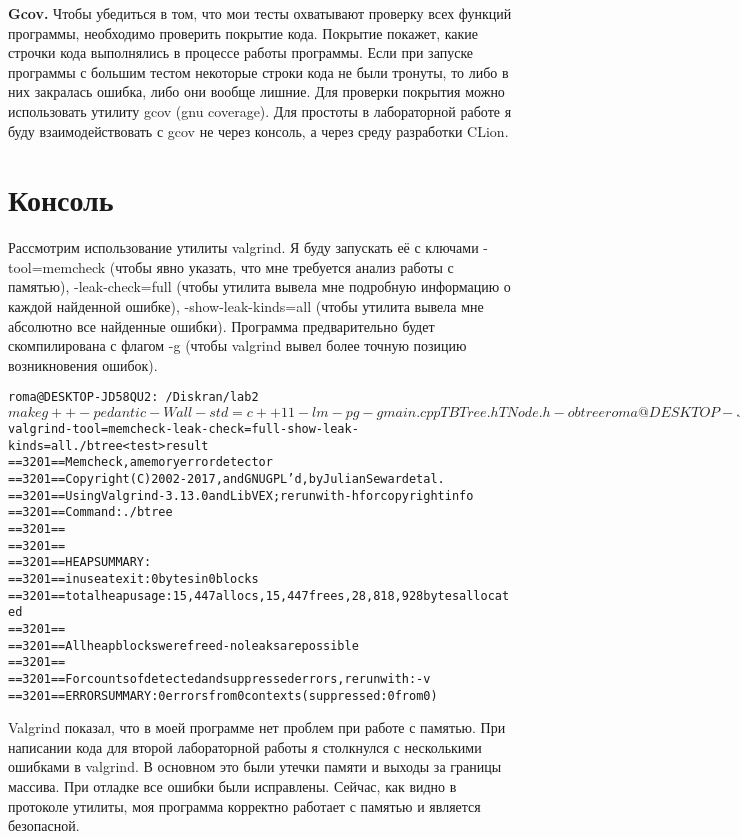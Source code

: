 \textbf{Gcov.} Чтобы убедиться в том, что мои тесты охватывают проверку всех функций программы, необходимо проверить покрытие 
кода. Покрытие покажет, какие строчки кода выполнялись в процессе работы программы. Если при запуске программы с большим тестом 
некоторые строки кода не были тронуты, то либо в них закралась ошибка, либо они вообще лишние. Для проверки покрытия можно 
использовать утилиту gcov (gnu coverage). Для простоты в лабораторной работе я буду взаимодействовать с gcov не через консоль, 
а через среду разработки CLion.


\pagebreak

\section{Консоль}


Рассмотрим использование утилиты valgrind. Я буду запускать её с ключами -tool=memcheck (чтобы явно указать, что мне требуется 
анализ работы с памятью), -leak-check=full (чтобы утилита вывела мне подробную информацию о каждой найденной ошибке), 
-show-leak-kinds=all (чтобы утилита вывела мне абсолютно все найденные ошибки). Программа предварительно будет скомпилирована 
с флагом -g (чтобы valgrind вывел более точную позицию возникновения ошибок).

\begin{alltt}

roma@DESKTOP-JD58QU2:~/Diskran/lab2$ make 
g++ -pedantic -Wall -std=c++11 -lm -pg -g main.cpp TBTree.h TNode.h -o btree 
roma@DESKTOP-JD58QU2:~/Diskran/lab2$ valgrind -tool=memcheck -leak-check=full -show-leak-kinds=all ./btree <test >result 
==3201== Memcheck,a memory error detector 
==3201== Copyright (C) 2002-2017,and GNU GPL’d,by Julian Seward et al.
==3201== Using Valgrind-3.13.0 and LibVEX; rerun with -h for copyright info 
==3201== Command: ./btree 
==3201== 
==3201== 
==3201== HEAP SUMMARY: 
==3201== in use at exit: 0 bytes in 0 blocks 
==3201== total heap usage: 15,447 allocs,15,447 frees,28,818,928 bytes allocated 
==3201== 
==3201== All heap blocks were freed - no leaks are possible 
==3201== 
==3201== For counts of detected and suppressed errors,rerun with: -v 
==3201== ERROR SUMMARY: 0 errors from 0 contexts (suppressed: 0 from 0)

\end{alltt}

Valgrind показал, что в моей программе нет проблем при работе с памятью. При написании кода для второй лабораторной работы 
я столкнулся с несколькими ошибками в valgrind. В основном это были утечки памяти и выходы за границы массива. 
При отладке все ошибки были исправлены. Сейчас, как видно в протоколе утилиты, моя программа корректно работает с памятью 
и является безопасной.


